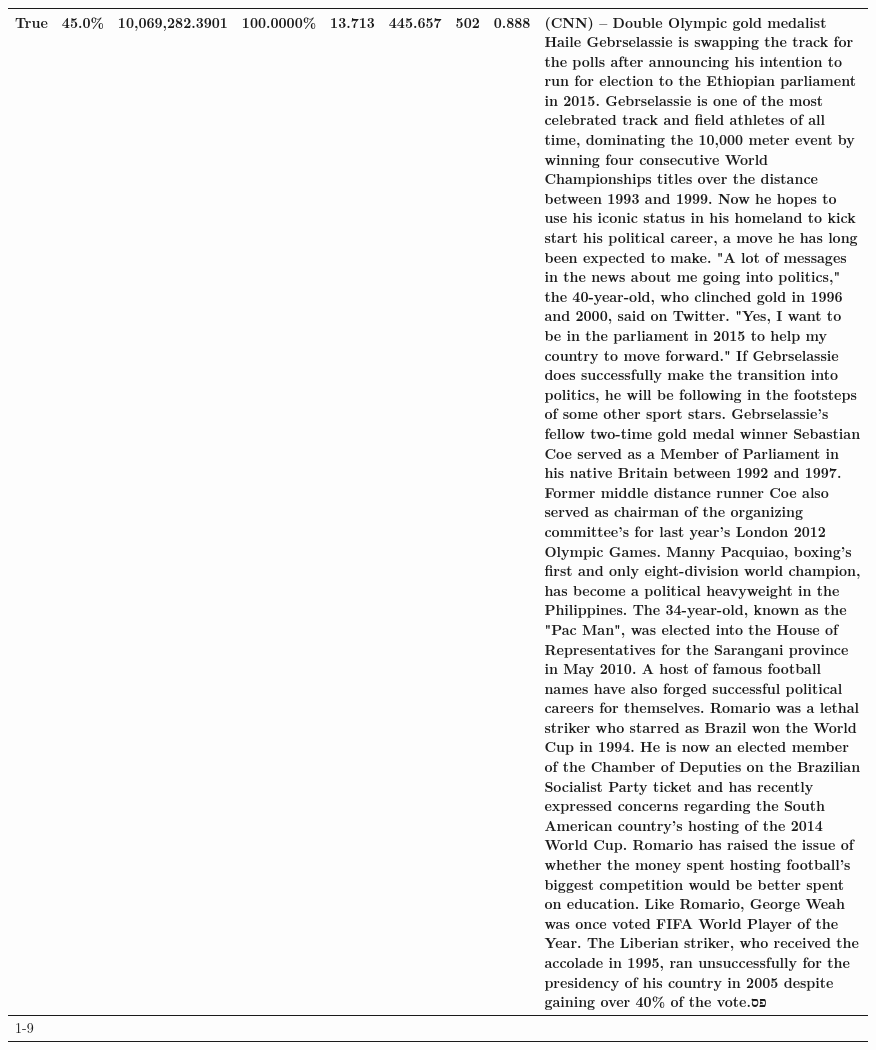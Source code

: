 \begin{table}[H]
{\begin{tabular}{lllrlllll}
True & 45.0\% & 10,069,282.3901 & \bfseries \color{red} 100.0000\% & 13.713 & 445.657 & 502 & 0.888 & (CNN) -- Double Olympic gold medalist Haile Gebrselassie is swapping the track for the polls after announcing his intention to run for election to the Ethiopian parliament in 2015. Gebrselassie is one of the most celebrated track and field athletes of all time, dominating the 10,000 meter event by winning four consecutive World Championships titles over the distance between 1993 and 1999. Now he hopes to use his iconic status in his homeland to kick start his political career, a move he has long been expected to make. "A lot of messages in the news about me going into politics," the 40-year-old, who clinched gold in 1996 and 2000, said on Twitter. "Yes, I want to be in the parliament in 2015 to help my country to move forward." If Gebrselassie does successfully make the transition into politics, he will be following in the footsteps of some other sport stars. Gebrselassie's fellow two-time gold medal winner Sebastian Coe served as a Member of Parliament in his native Britain between 1992 and 1997. Former middle distance runner Coe also served as chairman of the organizing committee's for last year's London 2012 Olympic Games. Manny Pacquiao, boxing's first and only eight-division world champion, has become a political heavyweight in the Philippines. The 34-year-old, known as the "Pac Man", was elected into the House of Representatives for the Sarangani province in May 2010. A host of famous football names have also forged successful political careers for themselves. Romario was a lethal striker who starred as Brazil won the World Cup in 1994. He is now an elected member of the Chamber of Deputies on the Brazilian Socialist Party ticket and has recently expressed concerns regarding the South American country's hosting of the 2014 World Cup. Romario has raised the issue of whether the money spent hosting football's biggest competition would be better spent on education. Like Romario, George Weah was once voted FIFA World Player of the Year. The Liberian striker, who received the accolade in 1995, ran unsuccessfully for the presidency of his country in 2005 despite gaining over 40\% of the vote.פס \\
\cline{1-9}

\end{tabular}}
\end{table}
